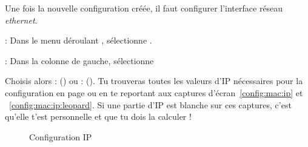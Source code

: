 


Une fois la nouvelle configuration créée, il faut configurer l'interface réseau \emph{ethernet}.



 : Dans le menu déroulant , sélectionne
.


 : Dans la colonne de gauche, sélectionne 

Choisis alors  :  () ou  :  (). Tu trouveras toutes les valeurs d'IP nécessaires pour la configuration en page \pageref{calcul_ip} ou en te reportant aux captures d'écran~\ref{config:mac:ip} et ~\ref{config:mac:ip:leopard}. Si une partie d'IP est blanche sur ces captures, c'est qu'elle t'est personnelle et que tu dois la calculer !

  \begin{figure}[!hl]
    \begin{center}
      \hfill
      \caption{Configuration IP}
    \end{center}
  \end{figure}
  
